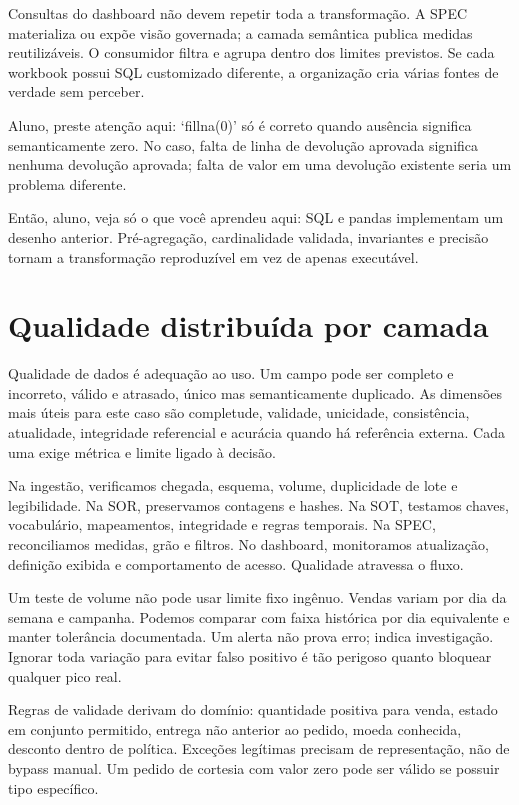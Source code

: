 Consultas do dashboard não devem repetir toda a transformação. A SPEC materializa ou expõe visão governada; a camada semântica publica medidas reutilizáveis. O consumidor filtra e agrupa dentro dos limites previstos. Se cada workbook possui SQL customizado diferente, a organização cria várias fontes de verdade sem perceber.

\begin{GuidedBox}
Aluno, preste atenção aqui: `fillna(0)' só é correto quando ausência significa semanticamente zero. No caso, falta de linha de devolução aprovada significa nenhuma devolução aprovada; falta de valor em uma devolução existente seria um problema diferente.
\end{GuidedBox}

\begin{SummaryBox}
Então, aluno, veja só o que você aprendeu aqui: SQL e pandas implementam um desenho anterior. Pré-agregação, cardinalidade validada, invariantes e precisão tornam a transformação reproduzível em vez de apenas executável.
\end{SummaryBox}

\section{Qualidade distribuída por camada}

Qualidade de dados é adequação ao uso. Um campo pode ser completo e incorreto, válido e atrasado, único mas semanticamente duplicado. As dimensões mais úteis para este caso são completude, validade, unicidade, consistência, atualidade, integridade referencial e acurácia quando há referência externa. Cada uma exige métrica e limite ligado à decisão.

Na ingestão, verificamos chegada, esquema, volume, duplicidade de lote e legibilidade. Na SOR, preservamos contagens e hashes. Na SOT, testamos chaves, vocabulário, mapeamentos, integridade e regras temporais. Na SPEC, reconciliamos medidas, grão e filtros. No dashboard, monitoramos atualização, definição exibida e comportamento de acesso. Qualidade atravessa o fluxo.

Um teste de volume não pode usar limite fixo ingênuo. Vendas variam por dia da semana e campanha. Podemos comparar com faixa histórica por dia equivalente e manter tolerância documentada. Um alerta não prova erro; indica investigação. Ignorar toda variação para evitar falso positivo é tão perigoso quanto bloquear qualquer pico real.

Regras de validade derivam do domínio: quantidade positiva para venda, estado em conjunto permitido, entrega não anterior ao pedido, moeda conhecida, desconto dentro de política. Exceções legítimas precisam de representação, não de bypass manual. Um pedido de cortesia com valor zero pode ser válido se possuir tipo específico.

